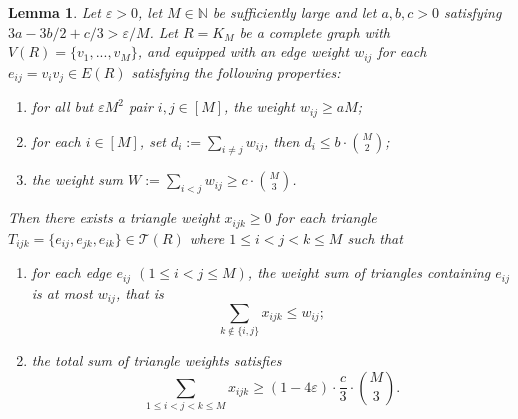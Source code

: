 \documentclass[11pt,reqno]{amsart}
\newtheorem{lemma}[theorem]{Lemma}
\theoremstyle{definition}
\theoremstyle{remark}
\newcommand\dT{\mathcal{T}}
\renewcommand\leq{\leqslant}
\renewcommand\geq{\geqslant}
\begin{document}
\begin{lemma}\label{lem:reducedweight}
Let $\varepsilon>0$, let $M\in\mathbb{N}$ be sufficiently large and let $a,b,c>0$ satisfying $3a-3b/2+c/3>\varepsilon/M$. Let $R=K_M$ be a complete graph with $V(R)=\{v_1,...,v_M\}$, and equipped with an edge weight $w_{ij}$ for each $e_{ij}=v_iv_j\in E(R)$ satisfying the following properties:
\begin{enumerate}
    \item[$(W_1)$] for all but $\varepsilon M^2$ pair $i,j\in[M]$, the weight $w_{ij}\geq aM$;

    \item[$(W_2)$] for each $i\in[M]$, set $d_i:=\sum_{i\neq j}w_{ij}$, then $d_i\leq b\cdot\binom{M}{2}$;

    \item[$(W_3)$] the weight sum $ W:=\sum_{i<j} w_{ij}\geq c\cdot \binom{M}{3}$.
\end{enumerate}
Then there exists a triangle weight $x_{ijk}\geq 0$ for each triangle $T_{ijk}=\{e_{ij},e_{jk},e_{ik}\}\in\dT(R)$ where $1\leq i<j<k\leq M$ such that 
\begin{enumerate}
    \item [$(X_1)$] for each edge $e_{ij}$ $(1\leq i<j\leq M)$, the weight sum of triangles containing $e_{ij}$ is at most $w_{ij}$, that is
    $$\sum_{k\notin\{i,j\}}x_{ijk}\leq w_{ij};$$

    \item [$(X_2)$] the total sum of triangle weights satisfies
    $$\sum_{1\leq i<j<k\leq M}x_{ijk}\geq (1-4\varepsilon)\cdot \frac{c}{3}\cdot\binom{M}{3}.$$
\end{enumerate}
\end{lemma}
\end{document}
